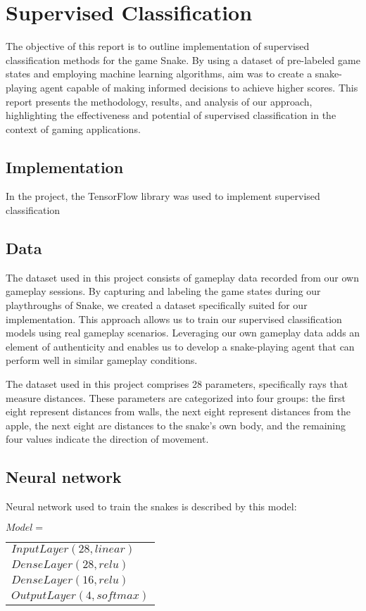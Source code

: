\section{Supervised Classification}
\label{sec:supervised_classification}
The objective of this report is to outline implementation of supervised classification methods for the game Snake. By using a dataset of pre-labeled game states and employing machine learning algorithms, aim was to create a snake-playing agent capable of making informed decisions to achieve higher scores. This report presents the methodology, results, and analysis of our approach, highlighting the effectiveness and potential of supervised classification in the context of gaming applications.
\subsection{Implementation}
In the project, the TensorFlow library was used to implement supervised classification

\subsection{Data}
The dataset used in this project consists of gameplay data recorded from our own gameplay sessions. By capturing and labeling the game states during our playthroughs of Snake, we created a dataset specifically suited for our implementation. This approach allows us to train our supervised classification models using real gameplay scenarios. Leveraging our own gameplay data adds an element of authenticity and enables us to develop a snake-playing agent that can perform well in similar gameplay conditions.

The dataset used in this project comprises 28 parameters, specifically rays that measure distances. These parameters are categorized into four groups: the first eight represent distances from walls, the next eight represent distances from the apple, the next eight are distances to the snake's own body, and the remaining four values indicate the direction of movement.

\subsection{Neural network}
Neural network used to train the snakes is described by this model:
\begin{center}
    $Model = $
    \begin{tabular}{l}
    $InputLayer(28, linear)$\\
    $DenseLayer(28, relu)$\\
    $DenseLayer(16, relu)$\\
    $OutputLayer(4, softmax)$
    \end{tabular}
\end{center}

